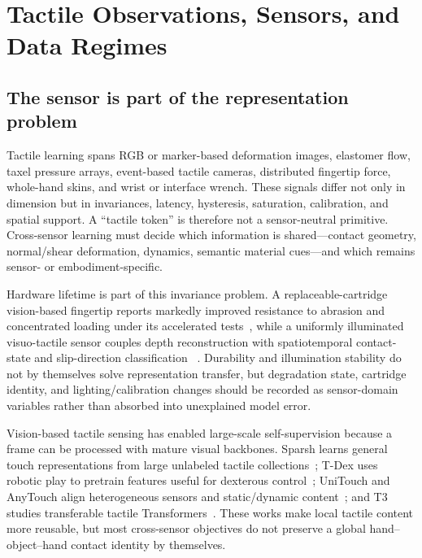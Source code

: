 \section{Tactile Observations, Sensors, and Data Regimes}
\label{sec:sensing}

\subsection{The sensor is part of the representation problem}

Tactile learning spans RGB or marker-based deformation images, elastomer flow,
taxel pressure arrays, event-based tactile cameras, distributed fingertip force,
whole-hand skins, and wrist or interface wrench. These signals differ not only in
dimension but in invariances, latency, hysteresis, saturation, calibration, and
spatial support. A ``tactile token'' is therefore not a sensor-neutral primitive.
Cross-sensor learning must decide which information is shared---contact geometry,
normal/shear deformation, dynamics, semantic material cues---and which remains
sensor- or embodiment-specific.

Hardware lifetime is part of this invariance problem. A replaceable-cartridge
vision-based fingertip reports markedly improved resistance to abrasion and
concentrated loading under its accelerated tests~\cite{cottrell2026durable}, while
a uniformly illuminated visuo-tactile sensor couples depth reconstruction with
spatiotemporal contact-state and slip-direction classification
~\cite{ma2026slip}. Durability and illumination stability do not by themselves
solve representation transfer, but degradation state, cartridge identity, and
lighting/calibration changes should be recorded as sensor-domain variables rather
than absorbed into unexplained model error.

Vision-based tactile sensing has enabled large-scale self-supervision because a
frame can be processed with mature visual backbones. Sparsh learns general touch
representations from large unlabeled tactile collections~\cite{higuera2025sparsh};
T-Dex uses robotic play to pretrain features useful for dexterous
control~\cite{guzey2023tdex}; UniTouch and AnyTouch align heterogeneous sensors and
static/dynamic content~\cite{yang2024unitouch,feng2025anytouch}; and T3 studies
transferable tactile Transformers~\cite{zhao2024t3}. These works make local tactile
content more reusable, but most cross-sensor objectives do not preserve a global
hand--object--hand contact identity by themselves.

